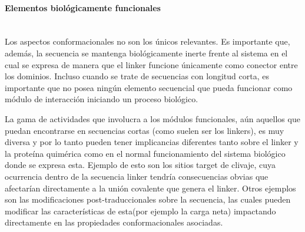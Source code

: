 \paragraph{Elementos biológicamente funcionales} \hspace{0pt} \\ \indent 
% 
% 
Los aspectos conformacionales no son los únicos relevantes. 
Es importante que, además, la secuencia se mantenga biológicamente inerte frente al sistema en el cual se expresa de manera que el linker funcione únicamente como conector entre los dominios.
Incluso cuando se trate de secuencias con longitud corta, es importante que no posea ningún elemento secuencial que pueda funcionar como módulo de interacción iniciando un proceso biológico. 

La gama de actividades que involucra a los módulos funcionales, aún aquellos que puedan encontrarse en secuencias cortas (como suelen ser los linkers), es muy diversa y por lo tanto pueden tener implicancias diferentes 
tanto sobre el linker y la proteína quimérica como en el normal funcionamiento del sistema biológico donde se expresa esta. %
Ejemplo de esto son los sitios target de clivaje, cuya ocurrencia dentro de la secuencia linker tendría consecuencias obvias que afectarían directamente a la unión covalente que genera el linker.
Otros ejemplos son las modificaciones post-traduccionales sobre la secuencia, las cuales pueden modificar las características de esta(por ejemplo la carga neta) impactando directamente en las propiedades conformacionales asociadas.



